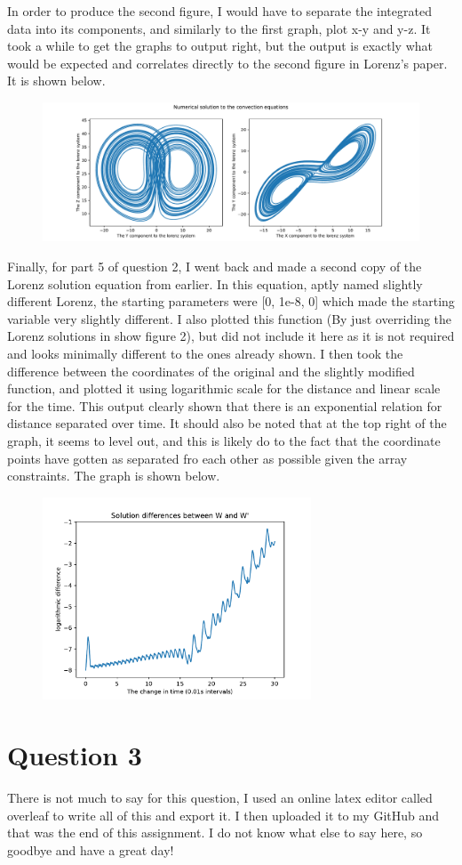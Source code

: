 \documentclass{article}
\begin{document}
In order to produce the second figure, I would have to separate the integrated data into its components, and similarly to the first graph, plot x-y and y-z. It took a while to get the graphs to output right, but the output is exactly what would be expected and correlates directly to the second figure in Lorenz's paper. It is shown below.

\begin{figure}[htp]
    \centering
    \includegraphics[width=13cm]{Figure_2.pdf}
\end{figure}

Finally, for part 5 of question 2, I went back and made a second copy of the Lorenz solution equation from earlier. In this equation, aptly named slightly different Lorenz, the starting parameters were [0, 1e-8, 0] which made the starting variable very slightly different. I also plotted this function (By just overriding the Lorenz solutions in show figure 2), but did not include it here as it is not required and looks minimally different to the ones already shown. I then took the difference between the coordinates of the original and the slightly modified function, and plotted it using logarithmic scale for the distance and linear scale for the time. This output clearly shown that there is an exponential relation for distance separated over time. It should also be noted that at the top right of the graph, it seems to level out, and this is likely do to the fact that the coordinate points have gotten as separated fro each other as possible given the array constraints. The graph is shown below.

\begin{figure}[htp]
    \centering
    \includegraphics[width=8cm]{Difference_plot.pdf}
\end{figure}

\section*{Question 3}

There is not much to say for this question, I used an online latex editor called overleaf to write all of this and export it. I then uploaded it to my GitHub and that was the end of this assignment. I do not know what else to say here, so goodbye and have a great day!
\end{document}
